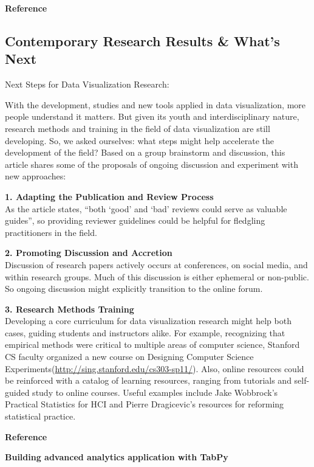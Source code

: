 \documentclass[]{book}
\theoremstyle{definition}
\theoremstyle{definition}
\theoremstyle{definition}
\theoremstyle{remark}
\begin{document}
\textbf{Reference} \citep{data_journ}

\subsection{Contemporary Research Results \& What's
Next}\label{contemporary-research-results-whats-next-1}

Next Steps for Data Visualization Research:

With the development, studies and new tools applied in data
visualization, more people understand it matters. But given its youth
and interdisciplinary nature, research methods and training in the field
of data visualization are still developing. So, we asked ourselves: what
steps might help accelerate the development of the field? Based on a
group brainstorm and discussion, this article shares some of the
proposals of ongoing discussion and experiment with new approaches:

\textbf{1. Adapting the Publication and Review Process}\\
As the article states, ``both `good' and `bad' reviews could serve as
valuable guides'', so providing reviewer guidelines could be helpful for
fledgling practitioners in the field.

\textbf{2. Promoting Discussion and Accretion}\\
Discussion of research papers actively occurs at conferences, on social
media, and within research groups. Much of this discussion is either
ephemeral or non-public. So ongoing discussion might explicitly
transition to the online forum.

\textbf{3. Research Methods Training}\\
Developing a core curriculum for data visualization research might help
both cases, guiding students and instructors alike. For example,
recognizing that empirical methods were critical to multiple areas of
computer science, Stanford CS faculty organized a new course on
Designing Computer Science
Experiments(\url{http://sing.stanford.edu/cs303-sp11/}). Also, online
resources could be reinforced with a catalog of learning resources,
ranging from tutorials and self-guided study to online courses. Useful
examples include Jake Wobbrock's Practical Statistics for HCI and Pierre
Dragicevic's resources for reforming statistical practice.

\textbf{Reference} \citep{next_steps}

\textbf{Building advanced analytics application with TabPy}\\
\citep{TabPy}
\end{document}
